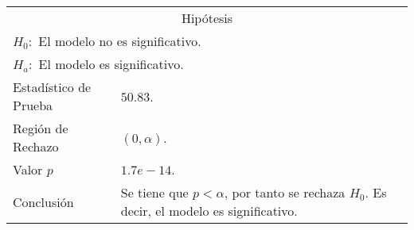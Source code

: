 \begin{center}
  \begin{tabular}{|l|p{11cm}|}
    \cline{1-2}
    \multicolumn{2}{|c|}{Hipótesis}\\ \cline{1-2}
    \multicolumn{2}{|l|}{\(H_0:\) El modelo no es significativo.} \\ 
    \multicolumn{2}{|l|}{\(H_a:\) El modelo es significativo.} \\ \cline{1-2}
    Estadístico de Prueba & \(50.83\).\\ \cline{1-2} 
    Región de Rechazo & \((0, \alpha )\).\\ \cline{1-2} 
    Valor \(p\) & \(1.7e-14\).\\ \cline{1-2} 
    Conclusión & Se tiene que \(p<\alpha\), por tanto se rechaza \(H_0\). Es decir, el modelo es significativo.\\ \cline{1-2} 
  \end{tabular}
\end{center} 



